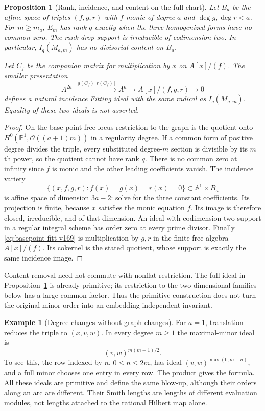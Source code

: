 \documentclass[11pt,reqno]{amsart}
\numberwithin{equation}{section}
\newtheorem{proposition}[theorem]{Proposition}
\theoremstyle{definition}\newtheorem{definition}[theorem]{Definition}
\newtheorem{example}[theorem]{Example}
\theoremstyle{remark}\newtheorem{remark}[theorem]{Remark}
\newcommand{\Pj}{\mathbb P}\newcommand{\A}{\mathbb A}
\newcommand{\OO}{\mathcal O}\newcommand{\II}{\mathcal I}
\begin{document}
\begin{proposition}[Rank, incidence, and content on the full chart]
\label{prop:incidence-content-v169}
Let $B_a$ be the affine space of triples $(f,g,r)$ with $f$ monic of
degree $a$ and $\deg g,\deg r<a$. For $m\geq m_a$, $E_m$ has rank $q$
exactly when the three homogenized forms have no common zero. The
rank-drop support is irreducible of codimension two. In particular,
$I_q(M_{a,m})$ has no divisorial content on $B_a$.

Let $C_f$ be the companion matrix for multiplication by $x$ on
$A[x]/(f)$. The smaller presentation
\begin{equation}\label{eq:basepoint-fitt-v169}
 A^{2a}\xrightarrow{[g(C_f)\ \ r(C_f)]}A^a
       \longrightarrow A[x]/(f,g,r)\longrightarrow0
\end{equation}
defines a natural incidence Fitting ideal with the same radical as
$I_q(M_{a,m})$. Equality of these two ideals is not asserted.
\end{proposition}
\begin{proof}
On the base-point-free locus restriction to the graph is the quotient
onto $H^0(\Pj^1,\OO((a+1)m))$ in a regularity degree. If a common form
of positive degree divides the triple, every substituted degree-$m$
section is divisible by its $m$th power, so the quotient cannot have
rank $q$. There is no common zero at infinity since $f$ is monic and
the other leading coefficients vanish. The incidence variety
\[
 \{(x,f,g,r):f(x)=g(x)=r(x)=0\}\subset\A^1\times B_a
\]
is affine space of dimension $3a-2$: solve for the three constant
coefficients. Its projection is finite, because $x$ satisfies the
monic equation $f$. Its image is therefore closed, irreducible, and
of that dimension. An ideal with codimension-two support in a regular
integral scheme has order zero at every prime divisor. Finally
\eqref{eq:basepoint-fitt-v169} is multiplication by $g,r$ in the finite
free algebra $A[x]/(f)$. Its cokernel is the stated quotient, whose
support is exactly the same incidence image.
\end{proof}
Content removal need not commute with nonflat restriction. The full
ideal in Proposition~\ref{prop:incidence-content-v169} is already
primitive; its restriction to the two-dimensional families below
has a large common factor. Thus the primitive construction does not
turn the original minor order into an embedding-independent invariant.

\begin{example}[Degree changes without graph changes]\label{ex:degree-content-v169}
For $a=1$, translation reduces the triple to $(x,v,w)$. In every degree
$m\geq1$ the maximal-minor ideal is
\[
 (v,w)^{m(m+1)/2}.
\]
To see this, the row indexed by $n$, $0\leq n\leq2m$, has ideal
$(v,w)^{\max(0,m-n)}$, and a full minor chooses one entry in every
row. The product gives the formula. All these ideals are primitive
and define the same blow-up, although their orders along an arc are
different. Their Smith lengths are lengths of different evaluation
modules, not lengths attached to the rational Hilbert map alone.
\end{example}
\end{document}
